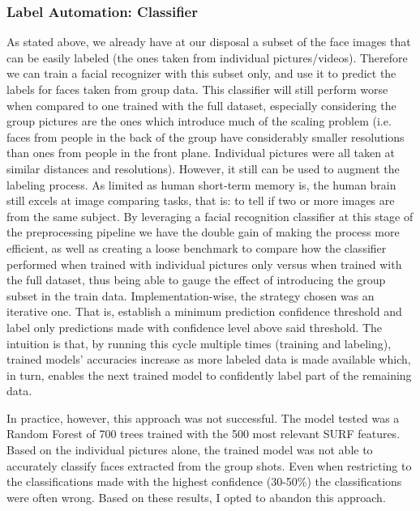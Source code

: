 \documentclass[11pt]{article}
\begin{document}
    \subsubsection{Label Automation: Classifier}\label{sec:face_labeling:classifier}
        As stated above, we already have at our disposal a subset of the face images that can be easily labeled (the ones taken from individual pictures/videos). Therefore we can train a facial recognizer with this subset only, and use it to predict the labels for faces taken from group data. This classifier will still perform worse when compared to one trained with the full dataset, especially considering the group pictures are the ones which introduce much of the scaling problem (i.e. faces from people in the back of the group have considerably smaller resolutions than ones from people in the front plane. Individual pictures were all taken at similar distances and resolutions). However, it still can be used to augment the labeling process. As limited as human short-term memory is, the human brain still excels at image comparing tasks, that is: to tell if two or more images are from the same subject. By leveraging a facial recognition classifier at this stage of the preprocessing pipeline we have the double gain of making the process more efficient, as well as creating a loose benchmark to compare how the classifier performed when trained with individual pictures only versus when trained with the full dataset, thus being able to gauge the effect of introducing the group subset in the train data. Implementation-wise, the strategy chosen was an iterative one. That is, establish a minimum prediction confidence threshold and label only predictions made with confidence level above said threshold. The intuition is that, by running this cycle multiple times (training and labeling), trained models' accuracies increase as more labeled data is made available which, in turn, enables the next trained model to confidently label part of the remaining data.

        In practice, however, this approach was not successful. The model tested was a Random Forest of 700 trees trained with the 500 most relevant SURF features. Based on the individual pictures alone, the trained model was not able to accurately classify faces extracted from the group shots. Even when restricting to the classifications made with the highest confidence (30-50\%) the classifications were often wrong. Based on these results, I opted to abandon this approach.
\end{document}
